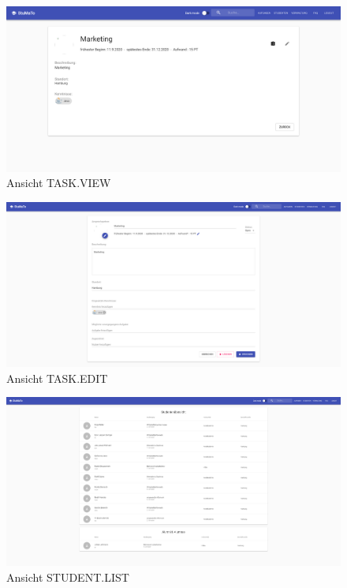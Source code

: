 \documentclass[
  12pt,
  ngerman,
  a4paper,
]{article}
\begin{document}
\begin{figure}
\centering
\includegraphics{./tex2pdf.-c803d322dfea80aa/7908951722dfee3f634678faf93fa21ee7f6c477.png}
\caption{Ansicht TASK.VIEW}
\end{figure}

\begin{figure}
\centering
\includegraphics{./tex2pdf.-c803d322dfea80aa/1526445399f73b404890c7f4a0cca5189b06eb12.png}
\caption{Ansicht TASK.EDIT}
\end{figure}

\begin{figure}
\centering
\includegraphics{./tex2pdf.-c803d322dfea80aa/14347ebd1a68ae90215eaa0204da9facc81485bd.png}
\caption{Ansicht STUDENT.LIST}
\end{figure}
\end{document}
